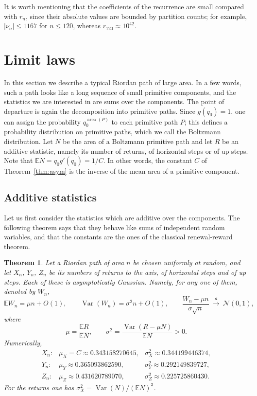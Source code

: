 \documentclass[11pt,reqno]{amsart}
\numberwithin{equation}{section}
\newtheorem{theorem}{Theorem}[section]
\theoremstyle{remark}
\newcommand{\area}{\operatorname{area}}
\begin{document}
It is worth mentioning that the coefficients of the recurrence are small compared with
$r_n$, since their absolute values are bounded by partition counts; for example,
$|\nu_n|\le1167$ for $n\le120$, whereas $r_{120}\approx10^{42}$.

\section{Limit laws}\label{sec:limit}

In this section we describe a typical Riordan path of large area. In a few words, such a
path looks like a long sequence of small primitive components, and the statistics we are
interested in are sums over the components. The point of departure is again the
decomposition into primitive paths. Since $g(q_0)=1$, one can assign the probability
$q_0^{\area(P)}$ to each primitive path $P$; this defines a probability distribution on
primitive paths, which we call the Boltzmann distribution. Let $N$ be the area of a
Boltzmann primitive path and let $R$ be an additive statistic, namely its number of
returns, of horizontal steps or of up steps. Note that $\mathbb E N=q_0g'(q_0)=1/C$. In
other words, the constant $C$ of Theorem~\ref{thm:asym} is the inverse of the mean area
of a primitive component.

\subsection{Additive statistics}
Let us first consider the statistics which are additive over the components. The
following theorem says that they behave like sums of independent random variables, and
that the constants are the ones of the classical renewal-reward theorem.

\begin{theorem}\label{thm:gauss}
Let a Riordan path of area $n$ be chosen uniformly at random, and let $X_n$, $Y_n$, $Z_n$
be its numbers of returns to the axis, of horizontal steps and of up steps. Each of these
is asymptotically Gaussian. Namely, for any one of them, denoted by $W_n$,
\[
\mathbb E W_n=\mu n+O(1),\qquad
\operatorname{Var}(W_n)=\sigma^2 n+O(1),\qquad
\frac{W_n-\mu n}{\sigma\sqrt n}\ \xrightarrow{\ d\ }\ \mathcal N(0,1),
\]
where
\begin{equation}\label{eq:renewal}
\mu=\frac{\mathbb ER}{\mathbb EN},\qquad \sigma^2=\frac{\operatorname{Var}(R-\mu N)}{\mathbb EN}>0 .
\end{equation}
Numerically,
\[
\begin{array}{lll}
X_n:& \mu_X=C\approx0.343158270645,& \sigma_X^2\approx0.344199446374,\\
Y_n:& \mu_Y\approx0.365093862590,& \sigma_Y^2\approx0.292149839727,\\
Z_n:& \mu_Z\approx0.431620789070,& \sigma_Z^2\approx0.225725860430.
\end{array}
\]
For the returns one has $\sigma_X^2=\operatorname{Var}(N)/(\mathbb EN)^3$.
\end{theorem}
\end{document}

